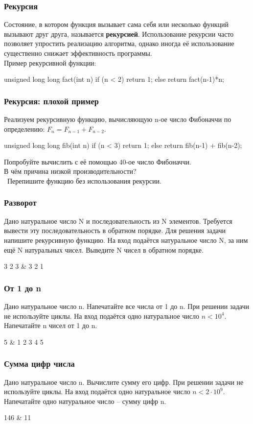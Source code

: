 \begin{frame}[fragile]
	\frametitle{Рекурсия}
	Состояние, в котором функция вызывает сама себя или несколько функций вызывают
	друг друга, называется {\bf рекурсией}. Использование рекурсии часто позволяет
	упростить реализацию алгоритма, однако иногда её использование существенно
	снижает эффективность программы. \\

	Пример рекурсивной функции:
	\begin{code}
unsigned long long fact(int n)
{
	if (n < 2)
		return 1;
	else
		return fact(n-1)*n;
}
	\end{code}
\end{frame}

\begin{frame}[fragile]
	\frametitle{Рекурсия: плохой пример}
	Реализуем рекурсивную функцию, вычисляющую n-ое число Фибоначчи по
	определению: $F_n = F_{n-1} + F_{n-2}$.

	\begin{code}
unsigned long long fib(int n)
{
	if (n < 3)
		return 1;
	else
		return fib(n-1) + fib(n-2);
}
	\end{code}
	Попробуйте вычислить с её помощью 40-ое число Фибоначчи. \\
	В чём причина низкой производительности? \\

	\bigqm \, Перепишите функцию без использования рекурсии.

\end{frame}

\begin{frame}
	\frametitle{Разворот}
	Дано натуральное число N и последовательность из N элементов. Требуется
	вывести эту последовательность в обратном порядке. Для решения задачи напишите
	рекурсивную функцию.
	\inp
	На вход подаётся натуральное число N, за ним ещё N натуральных чисел.
	\out
	Выведите N чисел в обратном порядке.
	\begin{ex}
		3  2 3 & 3 2 1\tb
	\end{ex}
\end{frame}

\begin{frame}
	\frametitle{От 1 до n}
	Дано натуральное число n. Напечатайте все числа от 1 до n. При решении задачи не
	используйте циклы.
	\inp
	На вход подаётся одно натуральное число $n < 10^4$.
	\out
	Напечатайте n чисел от 1 до n.
	\begin{ex}
		5 & 1 2 3 4 5\tb
	\end{ex}
\end{frame}

\begin{frame}
	\frametitle{Сумма цифр числа}
	Дано натуральное число n. Вычислите сумму его цифр. При решении задачи не
	используйте циклы.
	\inp
	На вход подаётся одно натуральное число $n < 2\cdot 10^9$.
	\out
	Напечатайте одно натуральное число -- сумму цифр n.
	\begin{ex}
		146 & 11\tb
	\end{ex}
\end{frame}


